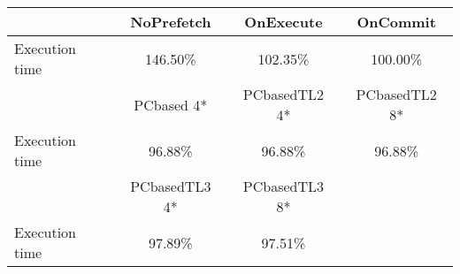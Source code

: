 \begin{tabular}{ l|ccc }
 & NoPrefetch & OnExecute & OnCommit\\ \hline
Execution time & 146.50\% & 102.35\% & 100.00\%\\ \hline
\hline
 & PCbased 4* & PCbasedTL2 4* & PCbasedTL2 8*\\ \hline
Execution time & 96.88\% & 96.88\% & 96.88\%\\ \hline
\hline
 & PCbasedTL3 4* & PCbasedTL3 8*&\\ \hline
Execution time & 97.89\% & 97.51\%&\\ \hline
\end{tabular}

